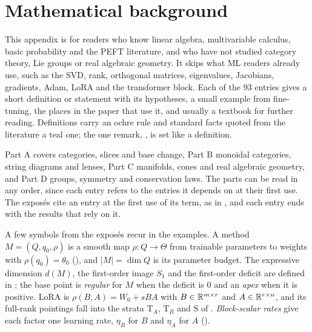 \providecommand{\fbAusedin}[1]{\par\smallskip\noindent{\small\color{inkgray}{\sffamily\bfseries\color{tide}Used in.}\enspace #1\par}\medskip}

\section{Mathematical background}\label{app:background}

This appendix is for readers who know linear algebra, multivariable calculus, basic probability and the PEFT literature,
and who have not studied category theory, Lie groups or real algebraic geometry. It skips what ML readers already use,
such as the SVD, rank, orthogonal matrices, eigenvalues, Jacobians, gradients, Adam, LoRA and the transformer block. Each
of the 93 entries gives a short definition or statement with its hypotheses, a small example from fine-tuning, the places
in the paper that use it, and usually a textbook for further reading. Definitions carry an ochre rule and standard facts
quoted from the literature a teal one; the one remark, , is set like a definition.

Part A covers categories, slices and base change, Part B monoidal categories, string diagrams and lenses, Part C
manifolds, cones and real algebraic geometry, and Part D groups, symmetry and conservation laws. The parts can be read in
any order, since each entry refers to the entries it depends on at their first use. The exposés cite an entry at the
first use of its term, as in , and each entry ends with the results that rely on it.

A few symbols from the exposés recur in the examples. A method $M=(Q,q_0,\rho)$ is a smooth map $\rho:Q\to\Theta$ from
trainable parameters to weights with $\rho(q_0)=\theta_0$ (), and $\lvert M\rvert=\dim Q$ is its parameter
budget. The expressive dimension $d(M)$, the first-order image $S_1$ and the first-order deficit are defined in
; the base point is \emph{regular} for $M$ when the deficit is $0$ and an \emph{apex} when it is positive. LoRA
\citep{hu2021lora} is $\rho(B,A)=W_0+sBA$ with $B\in\mathbb{R}^{m\times r}$ and $A\in\mathbb{R}^{r\times n}$, and its full-rank
pointings fall into the strata $\mathrm T_A$, $\mathrm T_B$ and $\mathrm S$ of . \emph{Block-scalar rates}
give each factor one learning rate, $\eta_B$ for $B$ and $\eta_A$ for $A$ ().

